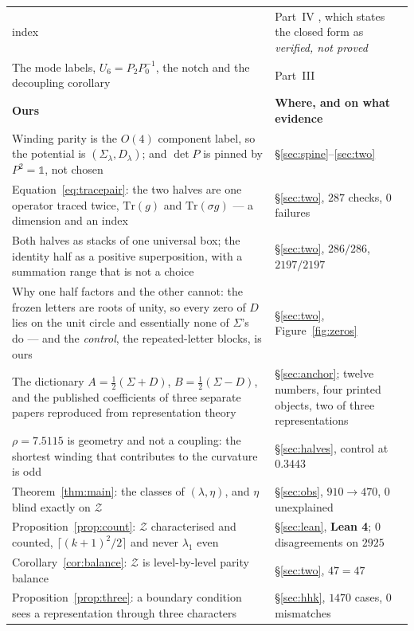 \documentclass[11pt,a4paper]{article}
\newcommand{\one}{\mathds{1}}
\newcommand{\Sig}{\Sigma_\lambda}
\newcommand{\Dl}{D_\lambda}
\begin{document}
\begin{longtable}{p{7.1cm} p{8.1cm}}
index & Part~IV \cite{PartIV}, which states the closed form as \emph{verified, not proved}\\
The mode labels, $U_6=P_2P_0^{-1}$, the notch and the decoupling corollary & Part~III \cite{PartIII}\\
\midrule
\rowcolor{okgreen!16}\textbf{Ours} & \textbf{Where, and on what evidence}\\
\midrule
Winding parity is the $O(4)$ component label, so the potential is $(\Sig,\Dl)$; and $\det P$ is
pinned by $P^2=\one$, not chosen & \S\ref{sec:spine}--\ref{sec:two}\\
Equation~\eqref{eq:tracepair}: the two halves are one operator traced twice, $\mathrm{Tr}(g)$ and
$\mathrm{Tr}(\sigma g)$ --- a dimension and an index & \S\ref{sec:two}, $287$ checks, $0$ failures\\
Both halves as stacks of one universal box; the identity half as a positive superposition, with a
summation range that is not a choice & \S\ref{sec:two}, $286/286$, $2197/2197$\\
Why one half factors and the other cannot: the frozen letters are roots of unity, so every zero of
$D$ lies on the unit circle and essentially none of $\Sigma$'s do --- and the \emph{control}, the
repeated-letter blocks, is ours & \S\ref{sec:two}, Figure~\ref{fig:zeros}\\
The dictionary $A=\tfrac12(\Sigma+D)$, $B=\tfrac12(\Sigma-D)$, and the published coefficients of
three separate papers reproduced from representation theory & \S\ref{sec:anchor}; \cite{AHMN} twelve
numbers, \cite{HY} four printed objects, \cite{HHHK} two of three representations\\
$\rho=7.5115$ is geometry and not a coupling: the shortest winding that contributes to the curvature
is odd & \S\ref{sec:halves}, control at $0.3443$\\
Theorem~\ref{thm:main}: the classes of $(\lambda,\eta)$, and $\eta$ blind exactly on $\mathcal Z$ &
\S\ref{sec:obs}, $910\to470$, $0$ unexplained\\
Proposition~\ref{prop:count}: $\mathcal Z$ characterised and counted, $\lceil(k+1)^2/2\rceil$ and
never $\lambda_1$ even & \S\ref{sec:lean}, \textbf{\color{okgreen}Lean 4}; $0$ disagreements on $2925$\\
Corollary~\ref{cor:balance}: $\mathcal Z$ is level-by-level parity balance & \S\ref{sec:two},
$47=47$\\
Proposition~\ref{prop:three}: a boundary condition sees a representation through three characters &
\S\ref{sec:hhk}, $1470$ cases, $0$ mismatches\\

\end{longtable}
\end{document}
